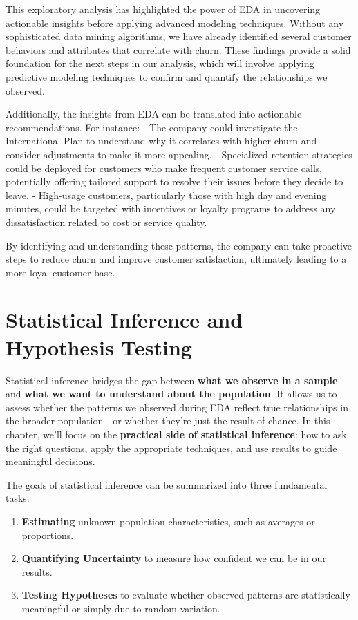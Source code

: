 \documentclass[
]{book}
\providecommand{\tightlist}{%
  \setlength{\itemsep}{0pt}\setlength{\parskip}{0pt}}
\theoremstyle{definition}
\theoremstyle{definition}
\theoremstyle{definition}
\theoremstyle{definition}
\theoremstyle{remark}
\begin{document}
This exploratory analysis has highlighted the power of EDA in uncovering actionable insights before applying advanced modeling techniques. Without any sophisticated data mining algorithms, we have already identified several customer behaviors and attributes that correlate with churn. These findings provide a solid foundation for the next steps in our analysis, which will involve applying predictive modeling techniques to confirm and quantify the relationships we observed.

Additionally, the insights from EDA can be translated into actionable recommendations. For instance:
- The company could investigate the International Plan to understand why it correlates with higher churn and consider adjustments to make it more appealing.
- Specialized retention strategies could be deployed for customers who make frequent customer service calls, potentially offering tailored support to resolve their issues before they decide to leave.
- High-usage customers, particularly those with high day and evening minutes, could be targeted with incentives or loyalty programs to address any dissatisfaction related to cost or service quality.

By identifying and understanding these patterns, the company can take proactive steps to reduce churn and improve customer satisfaction, ultimately leading to a more loyal customer base.

\chapter{Statistical Inference and Hypothesis Testing}\label{chapter-statistics}

Statistical inference bridges the gap between \textbf{what we observe in a sample} and \textbf{what we want to understand about the population}. It allows us to assess whether the patterns we observed during EDA reflect true relationships in the broader population---or whether they're just the result of chance. In this chapter, we'll focus on the \textbf{practical side of statistical inference}: how to ask the right questions, apply the appropriate techniques, and use results to guide meaningful decisions.

The goals of statistical inference can be summarized into three fundamental tasks:

\begin{enumerate}
\def\labelenumi{\arabic{enumi}.}
\tightlist
\item
  \textbf{Estimating} unknown population characteristics, such as averages or proportions.\\
\item
  \textbf{Quantifying Uncertainty} to measure how confident we can be in our results.\\
\item
  \textbf{Testing Hypotheses} to evaluate whether observed patterns are statistically meaningful or simply due to random variation.
\end{enumerate}
\end{document}

